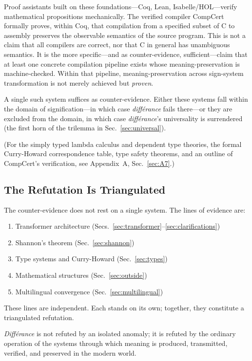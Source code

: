 \documentclass[a4paper,twocolumn,11pt]{article}
\begin{document}
Proof assistants built on these foundations---Coq, Lean, Isabelle/HOL---verify mathematical propositions mechanically. The verified compiler CompCert~\cite{Leroy2009} formally proves, within Coq, that compilation from a specified subset of C to assembly preserves the observable semantics of the source program. This is not a claim that all compilers are correct, nor that C in general has unambiguous semantics. It is the more specific---and as counter-evidence, sufficient---claim that at least one concrete compilation pipeline exists whose meaning-preservation is machine-checked. Within that pipeline, meaning-preservation across sign-system transformation is not merely achieved but \emph{proven}.

A single such system suffices as counter-evidence. Either these systems fall within the domain of signification---in which case \emph{diff\'erance} fails there---or they are excluded from the domain, in which case \emph{diff\'erance}'s universality is surrendered (the first horn of the trilemma in Sec.~\ref{sec:universal}).

(For the simply typed lambda calculus and dependent type theories, the formal Curry-Howard correspondence table, type safety theorems, and an outline of CompCert's verification, see Appendix~A, Sec.~\ref{sec:A7}.)

\subsection{The Refutation Is Triangulated}
\label{sec:triangulation}

The counter-evidence does not rest on a single system. The lines of evidence are:
\begin{enumerate}[noitemsep]
\item Transformer architecture (Secs.~\ref{sec:transformer}--\ref{sec:clarifications})
\item Shannon's theorem (Sec.~\ref{sec:shannon})
\item Type systems and Curry-Howard (Sec.~\ref{sec:types})
\item Mathematical structures (Sec.~\ref{sec:outside})
\item Multilingual convergence (Sec.~\ref{sec:multilingual})
\end{enumerate}
These lines are independent. Each stands on its own; together, they constitute a triangulated refutation.

\emph{Diff\'erance} is not refuted by an isolated anomaly; it is refuted by the ordinary operation of the systems through which meaning is produced, transmitted, verified, and preserved in the modern world.
\end{document}
